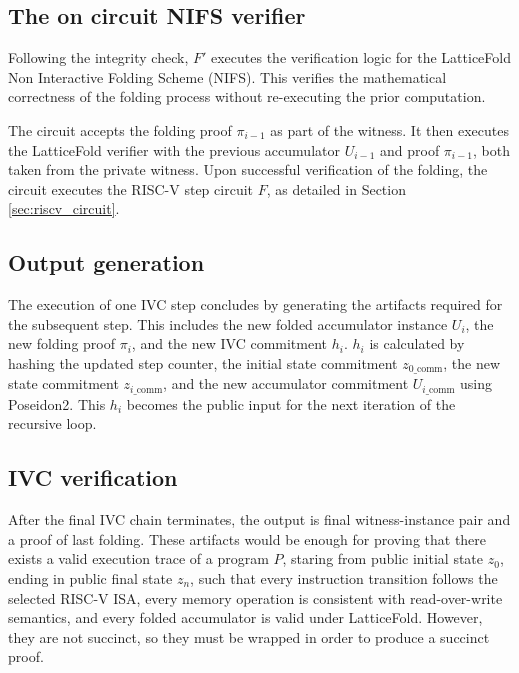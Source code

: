\subsection{The on circuit NIFS verifier}

Following the integrity check, $F'$ executes the verification logic for the
LatticeFold Non Interactive Folding Scheme (NIFS). This verifies the
mathematical correctness of the folding process without re-executing the prior computation.

The circuit accepts the folding proof $\pi_{i-1}$ as part of the witness. It
then executes the LatticeFold verifier with the previous accumulator $U_{i-1}$
and proof $\pi_{i-1}$, both taken from the private witness.
Upon successful verification of the folding, the circuit executes the RISC-V
step circuit $F$, as detailed in Section \ref{sec:riscv_circuit}.

\subsection{Output generation}

The execution of one IVC step concludes by generating the artifacts required for the
subsequent step. This includes the new folded accumulator instance $U_i$, the new
folding proof $\pi_i$, and the new IVC commitment $h_i$. $h_i$ is calculated by
hashing the updated step counter, the initial state commitment
$z_{0\_\text{comm}}$, the new state commitment $z_{i\_\text{comm}}$, and the
new accumulator commitment $U_{i\_\text{comm}}$ using Poseidon2. This
$h_i$ becomes the public input for the next iteration of the recursive loop.

\subsection{IVC verification}

After the final IVC chain terminates, the output is final witness-instance pair
and a proof of last folding. These artifacts would be enough for proving
that there exists a valid execution trace of a program $P$, staring from public
initial state $z_0$, ending in public final state $z_n$, such that every
instruction transition follows the selected RISC-V ISA, every memory
operation is consistent with read-over-write semantics, and every
folded accumulator is valid under LatticeFold. However, they are not succinct,
so they must be wrapped in order to produce a succinct proof.
